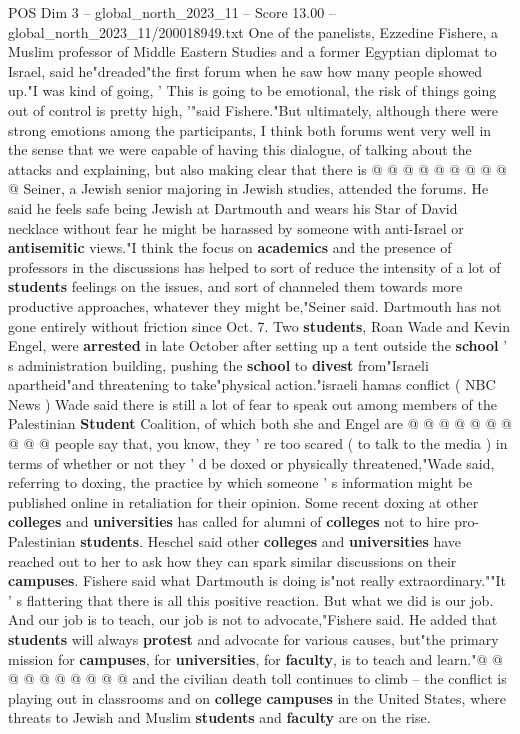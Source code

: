 \begin{textsample}{POS Dim 3 – global\_north\_2023\_11 – Score 13.00 – global\_north\_2023\_11/200018949.txt}
One of the panelists, Ezzedine Fishere, a Muslim professor of Middle Eastern Studies and a former Egyptian diplomat to Israel, said he"dreaded"the first forum when he saw how many people showed up."I was kind of going, ' This is going to be emotional, the risk of things going out of control is pretty high, '"said Fishere."But ultimately, although there were strong emotions among the participants, I think both forums went very well in the sense that we were capable of having this dialogue, of talking about the attacks and explaining, but also making clear that there is @ @ @ @ @ @ @ @ @ @ Seiner, a Jewish senior majoring in Jewish studies, attended the forums.
He said he feels safe being Jewish at Dartmouth and wears his Star of David necklace without fear he might be harassed by someone with anti-Israel or \textbf{antisemitic} views."I think the focus on \textbf{academics} and the presence of professors in the discussions has helped to sort of reduce the intensity of a lot of \textbf{students} feelings on the issues, and sort of channeled them towards more productive approaches, whatever they might be,"Seiner said.
Dartmouth has not gone entirely without friction since Oct. 7.
Two \textbf{students}, Roan Wade and Kevin Engel, were \textbf{arrested} in late October after setting up a tent outside the \textbf{school} ' s administration building, pushing the \textbf{school} to \textbf{divest} from"Israeli apartheid"and threatening to take"physical action."israeli hamas conflict ( NBC News ) Wade said there is still a lot of fear to speak out among members of the Palestinian \textbf{Student} Coalition, of which both she and Engel are @ @ @ @ @ @ @ @ @ @ people say that, you know, they ' re too scared ( to talk to the media ) in terms of whether or not they ' d be doxed or physically threatened,"Wade said, referring to doxing, the practice by which someone ' s information might be published online in retaliation for their opinion.
Some recent doxing at other \textbf{colleges} and \textbf{universities} has called for alumni of \textbf{colleges} not to hire pro-Palestinian \textbf{students}.
Heschel said other \textbf{colleges} and \textbf{universities} have reached out to her to ask how they can spark similar discussions on their \textbf{campuses}.
Fishere said what Dartmouth is doing is"not really extraordinary.""It ' s flattering that there is all this positive reaction.
But what we did is our job.
And our job is to teach, our job is not to advocate,"Fishere said.
He added that \textbf{students} will always \textbf{protest} and advocate for various causes, but"the primary mission for \textbf{campuses}, for \textbf{universities}, for \textbf{faculty}, is to teach and learn."@ @ @ @ @ @ @ @ @ @ and the civilian death toll continues to climb -- the conflict is playing out in classrooms and on \textbf{college} \textbf{campuses} in the United States, where threats to Jewish and Muslim \textbf{students} and \textbf{faculty} are on the rise.

\end{textsample}
